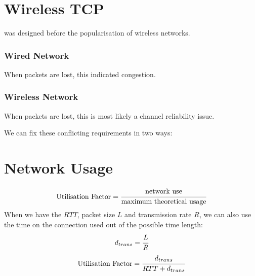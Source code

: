 \documentclass{report}
\begin{document}
    \section*{Wireless TCP}
         was designed before the popularisation of wireless networks.
        \\ \begin{minipage}{0.47\textwidth}
            \subsubsection*{Wired Network}
            When packets are lost, this indicated congestion.
        \end{minipage}
        \hfill
        \begin{minipage}{0.47\textwidth}
            \subsubsection*{Wireless Network}
            When packets are lost, this is most likely a channel reliability issue.
        \end{minipage}
        We can fix these conflicting requirements in two ways:
    
    \section*{Network Usage}
        \[\text{Utilisation Factor} = \cfrac{\text{network use}}{\text{maximum theoretical usage}}\]
        When we have the $RTT$, packet size $L$ and transmission rate $R$, we can also use the time on the connection used out of the possible time length:
        \[d_{trans} = \cfrac{L}{R}\]
        \[\text{Utilisation Factor} = \cfrac{d_{trans}}{RTT + d_{trans}}\]








    
            
\end{document}
